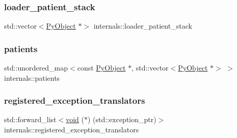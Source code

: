 \mbox{\label{structinternals_a4584170bdf82fabe271d296055c75ff7}} 
\subsubsection{\texorpdfstring{loader\_patient\_stack}{loader\_patient\_stack}}
{\footnotesize\ttfamily std\+::vector$<$\mbox{\hyperlink{_python27_2object_8h_aadc84ac7aed2cfa6f20c25f62bf3dac7}{Py\+Object}} $\ast$$>$ internals\+::loader\+\_\+patient\+\_\+stack}

\mbox{\label{structinternals_a10f84966ff086d44cd078d139b3646d9}} 
\subsubsection{\texorpdfstring{patients}{patients}}
{\footnotesize\ttfamily std\+::unordered\+\_\+map$<$const \mbox{\hyperlink{_python27_2object_8h_aadc84ac7aed2cfa6f20c25f62bf3dac7}{Py\+Object}} $\ast$, std\+::vector$<$\mbox{\hyperlink{_python27_2object_8h_aadc84ac7aed2cfa6f20c25f62bf3dac7}{Py\+Object}} $\ast$$>$ $>$ internals\+::patients}

\mbox{\label{structinternals_a77114b8520f529d44be95aa700a7cd29}} 
\subsubsection{\texorpdfstring{registered\_exception\_translators}{registered\_exception\_translators}}
{\footnotesize\ttfamily std\+::forward\+\_\+list$<$\mbox{\hyperlink{_s_d_l__opengles2__gl2ext_8h_ae5d8fa23ad07c48bb609509eae494c95}{void}} ($\ast$) (std\+::exception\+\_\+ptr)$>$ internals\+::registered\+\_\+exception\+\_\+translators}

\mbox{\label{structinternals_af0f521098c149429cd68e058fae16e06}} 
